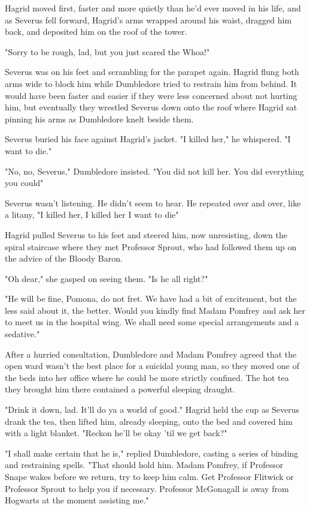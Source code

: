 Hagrid moved first, faster and more quietly than he'd ever moved in his life, and as Severus fell forward, Hagrid's arms wrapped around his waist, dragged him back, and deposited him on the roof of the tower.

"Sorry to be rough, lad, but you just scared the{\el} Whoa!"

Severus was on his feet and scrambling for the parapet again. Hagrid flung both arms wide to block him while Dumbledore tried to restrain him from behind. It would have been faster and easier if they were less concerned about not hurting him, but eventually they wrestled Severus down onto the roof where Hagrid sat pinning his arms as Dumbledore knelt beside them.

Severus buried his face against Hagrid's jacket. "I killed her," he whispered. "I want to die."

"No, no, Severus," Dumbledore insisted. "You did not kill her. You did everything you could{\el}"

Severus wasn't listening. He didn't seem to hear. He repeated over and over, like a litany, "I killed her, I killed her{\el} I want to die{\el}"

Hagrid pulled Severus to his feet and steered him, now unresisting, down the spiral staircase where they met Professor Sprout, who had followed them up on the advice of the Bloody Baron.

"Oh dear," she gasped on seeing them. "Is he all right?"

"He will be fine, Pomona, do not fret. We have had a bit of excitement, but the less said about it, the better. Would you kindly find Madam Pomfrey and ask her to meet us in the hospital wing. We shall need some special arrangements and a sedative."

After a hurried consultation, Dumbledore and Madam Pomfrey agreed that the open ward wasn't the best place for a suicidal young man, so they moved one of the beds into her office where he could be more strictly confined. The hot tea they brought him there contained a powerful sleeping draught.

"Drink it down, lad. It'll do ya a world of good." Hagrid held the cup as Severus drank the tea, then lifted him, already sleeping, onto the bed and covered him with a light blanket. "Reckon he'll be okay 'til we get back?"

"I shall make certain that he is," replied Dumbledore, casting a series of binding and restraining spells. "That should hold him. Madam Pomfrey, if Professor Snape wakes before we return, try to keep him calm. Get Professor Flitwick or Professor Sprout to help you if necessary. Professor McGonagall is away from Hogwarts at the moment assisting me."

